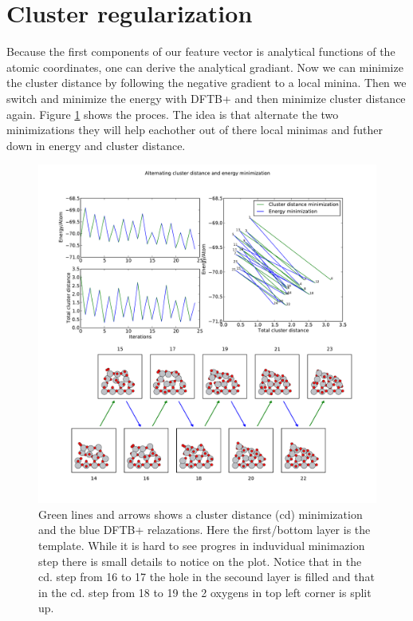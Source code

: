 \documentclass[%
 aps,
 prl,%
 amsmath,amssymb,
 reprint,%
]{revtex4-1}
\begin{document}
\section{Cluster regularization}

Because the first components of our feature vector is analytical functions of the atomic coordinates, one can derive the analytical gradiant. Now we can minimize the cluster distance by following the negative gradient to a local minina. Then we switch and minimize the energy with DFTB+ and then minimize cluster distance again. Figure \ref{fig_min} shows the proces. The idea is that alternate the two minimizations they will help eachother out of there local minimas and futher down in energy and cluster distance.
   
\begin{figure}[h]
    \centering
    \includegraphics[width=2.0\columnwidth]{acdminplot_74_98_ridgemin2_5_9_500_Ti13O26Ridge.pdf}
    \caption{Green lines and arrows shows a cluster distance (cd) minimization and the blue DFTB+ relazations. Here the first/bottom layer is the template. While it is hard to see progres in induvidual minimazion step there is small details to notice on the plot. Notice that in the cd. step from 16 to 17 the hole in the secound layer is filled and that in the cd. step from 18 to 19 the 2 oxygens in top left corner is split up.}
    \label{fig_min}
\end{figure}
\end{document}
